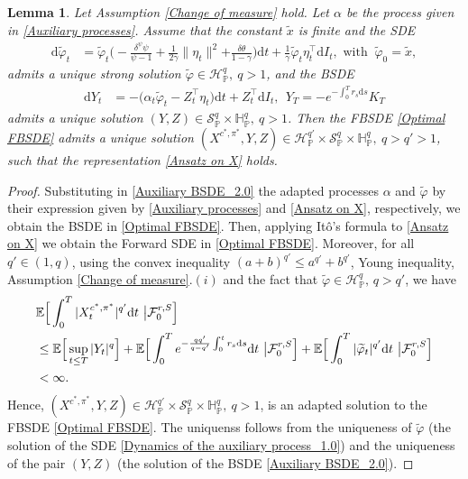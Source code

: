 \documentclass[12,reqno]{amsart}
\numberwithin{equation}{section}
\newtheorem{lemm}[defi]{Lemma}
\begin{document}
\begin{lemm}\label{Solvability of the FBSDE}
	Let Assumption \ref{Change of measure} hold. Let $\alpha$ be the process given in \eqref{Auxiliary processes}. Assume that the constant $\widetilde{x}$ is finite and the SDE
	\begin{align}\label{Dynamics of the auxiliary process_1.0}
		\mathrm{d}\widetilde{\varphi}_{t}&=\widetilde{\varphi}_{t}\Big(-\frac{\delta^{\psi}\psi}{\psi-1}+\frac{1}{2\gamma}\|\eta_{t}\|^{2}{+\frac{\delta\theta}{1-\gamma}}\Big)\mathrm{d}t+\frac{1}{\gamma}\widetilde{\varphi}_{t}\eta_{t}^{\top}\mathrm{d}I_{t},\text{ with }~\widetilde{\varphi}_{0}=\widetilde{x},
	\end{align}
	admits a unique strong solution $\widetilde{\varphi}\in\mathcal{H}_{\mathbb{P}}^{q},~q>1$, and the BSDE
	\begin{align}\label{Auxiliary BSDE_2.0}
		\mathrm{d}Y_{t}&=-\Big(\alpha_{t}\widetilde{\varphi}_{t} -Z_{t}^{\top}\eta_{t}\Big)\mathrm{d}t+Z_{t}^{\top}\mathrm{d}I_{t},~~Y_{T}=-e^{-\int_{0}^{T}r_{s}\mathrm{d}s}K_{T}
	\end{align}
	admits a unique solution $(Y,Z)\in\mathcal{S}_{\mathbb{P}}^{q}\times\mathbb{H}_{\mathbb{P}}^{q},~q>1$. Then the FBSDE \eqref{Optimal FBSDE} admits a unique solution $(X^{c^{*},\pi^{*}},Y,Z)\in\mathcal{H}_{\mathbb{P}}^{q'}\times\mathcal{S}_{\mathbb{P}}^{q}\times\mathbb{H}_{\mathbb{P}}^{q},~q>q'>1$, such that the representation \eqref{Ansatz on X} holds.
\end{lemm}
\begin{proof}
	Substituting in \eqref{Auxiliary BSDE_2.0} the adapted processes $\alpha$ and $\widetilde{\varphi}$ by their expression given by \eqref{Auxiliary processes} and \eqref{Ansatz on X}, respectively, we obtain the BSDE in \eqref{Optimal FBSDE}. Then, applying It{\^o}'s formula to \eqref{Ansatz on X} we obtain the Forward SDE in \eqref{Optimal FBSDE}. Moreover, for all $q'\in(1,q)$, using the convex inequality $(a+b)^{q'}\le a^{q'}+b^{q'}$, Young inequality, Assumption \ref{Change of measure}$.(i)$ and the fact that $\widetilde{\varphi}\in\mathcal{H}_{\mathbb{P}}^{q},\,q>q'$, we have
	\begin{align*}
		&\mathbb{E}\Big[\int_{0}^{T}|X_{t}^{c^{*},\pi^{*}}|^{q'}\mathrm{d}t~\big|\mathcal{F}_{0}^{r,S}\Big]\notag\\
		&\le\mathbb{E}\Big[\sup_{t\le T} |Y_{t}|^{q}\Big]+\mathbb{E}\Big[\int_{0}^{T}e^{-\frac{qq'}{q-q'}\int_{0}^{t}r_{s}\mathrm{d}s}\mathrm{d}t~\big|\mathcal{F}_{0}^{r,S}\Big]+\mathbb{E}\Big[\int_{0}^{T}|\widetilde{\varphi}_{t}|^{q'}\mathrm{d}t~\big|\mathcal{F}_{0}^{r,S}\Big]\notag\\
		&<\infty.
	\end{align*}
	Hence, $(X^{c^{*},\pi^{*}},Y,Z)\in\mathcal{H}_{\mathbb{P}}^{q'}\times\mathcal{S}_{\mathbb{P}}^{q}\times\mathbb{H}_{\mathbb{P}}^{q},~q>1$, is an adapted solution to the FBSDE \eqref{Optimal FBSDE}. The uniquenss follows from the uniqueness of $\widetilde{\varphi}$ (the solution of the SDE \eqref{Dynamics of the auxiliary process_1.0}) and the uniqueness of the pair $(Y,Z)$ (the solution of the BSDE \eqref{Auxiliary BSDE_2.0}).
\end{proof}
\end{document}
